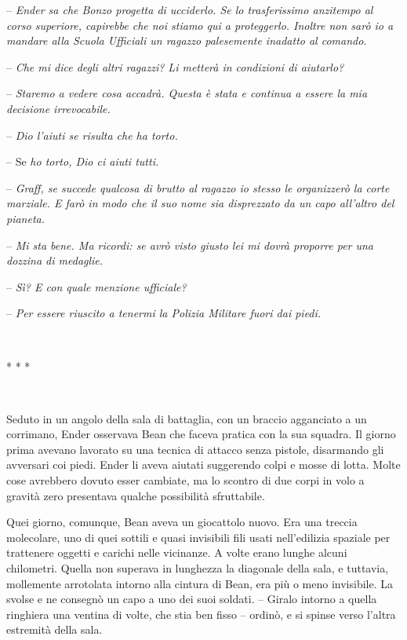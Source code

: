 {-- \emph{Ender sa che Bonzo progetta di ucciderlo. Se lo trasferissimo
		anzitempo al corso superiore, capirebbe che noi stiamo qui a
		proteggerlo. Inoltre non sarò io a mandare alla Scuola Ufficiali un
		ragazzo palesemente inadatto al comando.}}

{-- \emph{Che mi dice degli altri ragazzi? Li metterà in condizioni di
		aiutarlo?}}

{-- \emph{Staremo a vedere cosa accadrà. Questa è stata e continua a
		essere la mia decisione irrevocabile.}}

{-- \emph{Dio l'aiuti se risulta che ha torto.}}

{-- Se \emph{ho torto, Dio ci aiuti tutti.}}

{-- \emph{Graff, se succede qualcosa di brutto al ragazzo io stesso le
		organizzerò la corte marziale. E farò in modo che il suo nome sia
		disprezzato da un capo all'altro del pianeta.}}

{-- \emph{Mi sta bene. Ma ricordi: se avrò visto giusto lei mi dovrà
		proporre per una dozzina di medaglie.}}

{-- \emph{Sì? E con quale menzione ufficiale?}}

{-- \emph{Per essere riuscito a tenermi la Polizia Militare fuori dai
		piedi.}}

{~}

\begin{center}
	{* * *}
\end{center}

{~}

{Seduto in un angolo della sala di battaglia, con un braccio agganciato
	a un corrimano, Ender osservava Bean che faceva pratica con la sua
	squadra. Il giorno prima avevano lavorato su una tecnica di attacco
	senza pistole, disarmando gli avversari coi piedi. Ender li aveva
	aiutati suggerendo colpi e mosse di lotta. Molte cose avrebbero dovuto
	esser cambiate, ma lo scontro di due corpi in volo a gravità zero
	presentava qualche possibilità sfruttabile.}

{Quei giorno, comunque, Bean aveva un giocattolo nuovo. Era una treccia
	molecolare, uno di quei sottili e quasi invisibili fili usati
	nell'edilizia spaziale per trattenere oggetti e carichi nelle vicinanze.
	A volte erano lunghe alcuni chilometri. Quella non superava in lunghezza
	la diagonale della sala, e tuttavia, mollemente arrotolata intorno alla
	cintura di Bean, era più o meno invisibile. La svolse e ne consegnò un
	capo a uno dei suoi soldati. -- Giralo intorno a quella ringhiera una
	ventina di volte, che stia ben fisso -- ordinò, e si spinse verso
	l'altra estremità della sala.}

